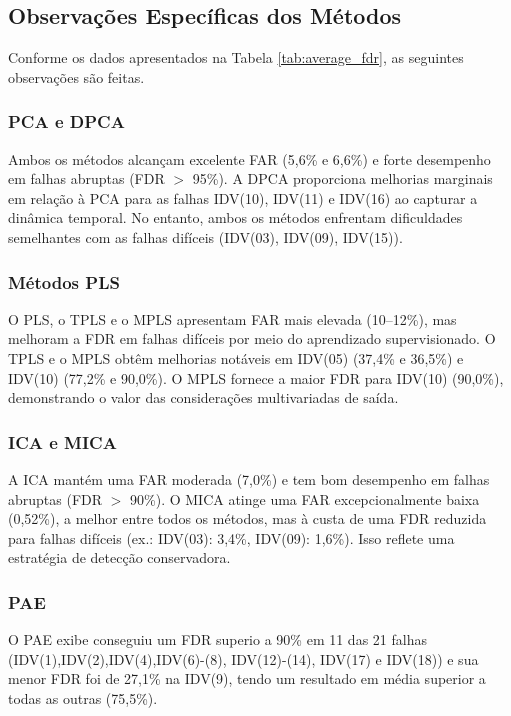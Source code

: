 \documentclass[journal]{IEEEtran}
\begin{document}
\subsection{Observações Específicas dos Métodos}
\label{subsec:method_insights}

Conforme os dados apresentados na Tabela \ref{tab:average_fdr}, as seguintes observações são feitas.

\subsubsection{PCA e DPCA}

Ambos os métodos alcançam excelente FAR (5,6\% e 6,6\%) e forte desempenho em falhas abruptas (FDR $>$ 95\%). A DPCA proporciona melhorias marginais em relação à PCA para as falhas IDV(10), IDV(11) e IDV(16) ao capturar a dinâmica temporal. No entanto, ambos os métodos enfrentam dificuldades semelhantes com as falhas difíceis (IDV(03), IDV(09), IDV(15)).

\subsubsection{Métodos PLS}

O PLS, o TPLS e o MPLS apresentam FAR mais elevada (10--12\%), mas melhoram a FDR em falhas difíceis por meio do aprendizado supervisionado. O TPLS e o MPLS obtêm melhorias notáveis em IDV(05) (37,4\% e 36,5\%) e IDV(10) (77,2\% e 90,0\%). O MPLS fornece a maior FDR para IDV(10) (90,0\%), demonstrando o valor das considerações multivariadas de saída.

\subsubsection{ICA e MICA}

A ICA mantém uma FAR moderada (7,0\%) e tem bom desempenho em falhas abruptas (FDR $>$ 90\%). O MICA atinge uma FAR excepcionalmente baixa (0,52\%), a melhor entre todos os métodos, mas à custa de uma FDR reduzida para falhas difíceis (ex.: IDV(03): 3,4\%, IDV(09): 1,6\%). Isso reflete uma estratégia de detecção conservadora.

\subsubsection{PAE}

O PAE exibe conseguiu um FDR  superio a 90\% em 11 das 21 falhas (IDV(1),IDV(2),IDV(4),IDV(6)-(8), IDV(12)-(14), IDV(17) e IDV(18)) e sua menor FDR foi de 27,1\% na IDV(9), tendo um resultado em média superior a todas as outras (75,5\%).
\end{document}
